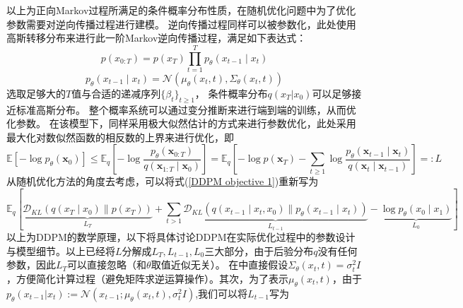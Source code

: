 以上为正向Markov过程所满足的条件概率分布性质，在随机优化问题中为了优化参数需要对逆向传播过程进行建模。
逆向传播过程同样可以被参数化，此处使用高斯转移分布来进行此一阶Markov逆向传播过程，满足如下表达式：
\begin{equation}
    p\left(x_{0: T}\right)=p\left(x_T\right) \prod_{t=1}^T p_\theta\left(x_{t-1} \mid x_t\right)
    \end{equation}
    \begin{equation}
        p_\theta\left(x_{t-1} \mid x_t\right)=\mathcal{N}\left(\mu_\theta\left(x_t, t\right), \Sigma_\theta\left(x_t, t\right)\right)
        \end{equation}
选取足够大的$T$值与合适的递减序列$\{\beta_t\}_{t\geq 1}$， 条件概率分布$q(x_{T}|x_0)$可以足够接近标准高斯分布。
整个概率系统可以通过变分推断来进行端到端的训练，从而优化参数。
在该模型下，同样采用极大似然估计的方式来进行参数优化，此处采用最大化对数似然函数的相反数的上界来进行优化，即
\begin{equation}
    \mathbb{E}\left[-\log p_\theta\left(\mathbf{x}_0\right)\right] \leq \mathbb{E}_q\left[-\log \frac{p_\theta\left(\mathbf{x}_{0: T}\right)}{q\left(\mathbf{x}_{1: T} \mid \mathbf{x}_0\right)}\right]=\mathbb{E}_q\left[-\log p\left(\mathbf{x}_T\right)-\sum_{t \geq 1} \log \frac{p_\theta\left(\mathbf{x}_{t-1} \mid \mathbf{x}_t\right)}{q\left(\mathbf{x}_t \mid \mathbf{x}_{t-1}\right)}\right]=: L
    \label{DDPM objective 1}
\end{equation}
从随机优化方法的角度去考虑，可以将式(\ref{DDPM objective 1})重新写为
\begin{equation}
\mathbb{E}_q[\underbrace{\mathcal{D}_{K L}\left(q\left(x_T \mid x_0\right) \| p\left(x_T\right)\right)}_{L_T}+\sum_{t>1} \underbrace{\mathcal{D}_{K L}\left(q\left(x_{t-1} \mid x_t, x_0\right) \| p_\theta\left(x_{t-1} \mid x_t\right)\right)}_{L_{t-1}}-\underbrace{\log p_\theta\left(x_0 \mid x_1\right)}_{L_0}]
    \end{equation}
以上为DDPM的数学原理，以下将具体讨论DDPM在实际优化过程中的参数设计与模型细节。以上已经将$L$分解成$L_T,L_{t-1},L_0$三大部分，由于后验分布$q$没有任何参数，因此$L_T$可以直接忽略（和$\theta$取值近似无关）。
在\cite{DDPM}中直接假设$\Sigma_{\theta}(x_t,t)=\sigma_t^2 I$，方便简化计算过程（避免矩阵求逆运算操作）。其次，为了表示$\mu_{\theta}(x_t,t)$，由于$p_{\theta}(x_{t-1}|x_t):= \mathcal{N}(x_{t-1};\mu_{\theta}(x_t,t),\sigma_t^2I)$,我们可以将$L_{t-1}$写为
